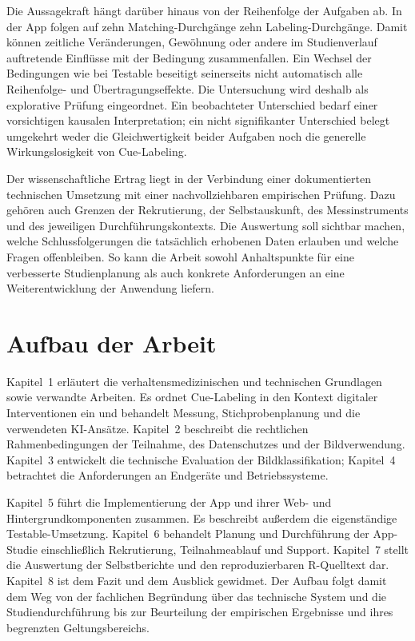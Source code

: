 Die Aussagekraft hängt darüber hinaus von der Reihenfolge der Aufgaben ab. In der App folgen auf zehn Matching-Durchgänge zehn Labeling-Durchgänge. Damit können zeitliche Veränderungen, Gewöhnung oder andere im Studienverlauf auftretende Einflüsse mit der Bedingung zusammenfallen. Ein Wechsel der Bedingungen wie bei Testable beseitigt seinerseits nicht automatisch alle Reihenfolge- und Übertragungseffekte. Die Untersuchung wird deshalb als explorative Prüfung eingeordnet. Ein beobachteter Unterschied bedarf einer vorsichtigen kausalen Interpretation; ein nicht signifikanter Unterschied belegt umgekehrt weder die Gleichwertigkeit beider Aufgaben noch die generelle Wirkungslosigkeit von Cue-Labeling.

Der wissenschaftliche Ertrag liegt in der Verbindung einer dokumentierten technischen Umsetzung mit einer nachvollziehbaren empirischen Prüfung. Dazu gehören auch Grenzen der Rekrutierung, der Selbstauskunft, des Messinstruments und des jeweiligen Durchführungskontexts. Die Auswertung soll sichtbar machen, welche Schlussfolgerungen die tatsächlich erhobenen Daten erlauben und welche Fragen offenbleiben. So kann die Arbeit sowohl Anhaltspunkte für eine verbesserte Studienplanung als auch konkrete Anforderungen an eine Weiterentwicklung der Anwendung liefern.

\section*{Aufbau der Arbeit}

Kapitel~1 erläutert die verhaltensmedizinischen und technischen Grundlagen sowie verwandte Arbeiten. Es ordnet Cue-Labeling in den Kontext digitaler Interventionen ein und behandelt Messung, Stichprobenplanung und die verwendeten KI-Ansätze. Kapitel~2 beschreibt die rechtlichen Rahmenbedingungen der Teilnahme, des Datenschutzes und der Bildverwendung. Kapitel~3 entwickelt die technische Evaluation der Bildklassifikation; Kapitel~4 betrachtet die Anforderungen an Endgeräte und Betriebssysteme.

Kapitel~5 führt die Implementierung der App und ihrer Web- und Hintergrundkomponenten zusammen. Es beschreibt außerdem die eigenständige Testable-Umsetzung. Kapitel~6 behandelt Planung und Durchführung der App-Studie einschließlich Rekrutierung, Teilnahmeablauf und Support. Kapitel~7 stellt die Auswertung der Selbstberichte und den reproduzierbaren R-Quelltext dar. Kapitel~8 ist dem Fazit und dem Ausblick gewidmet. Der Aufbau folgt damit dem Weg von der fachlichen Begründung über das technische System und die Studiendurchführung bis zur Beurteilung der empirischen Ergebnisse und ihres begrenzten Geltungsbereichs.

\par
\clearpage
\endgroup
